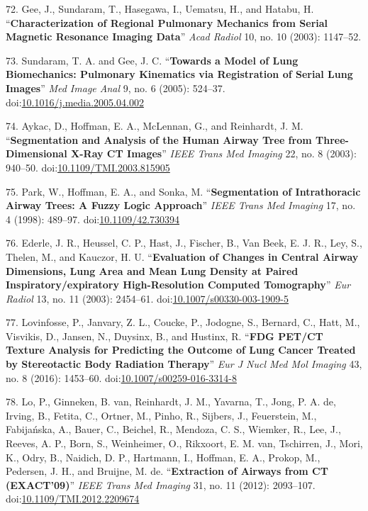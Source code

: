 \documentclass[11pt,]{article}
\begin{document}
\hypertarget{ref-Gee:2003aa}{}
72. Gee, J., Sundaram, T., Hasegawa, I., Uematsu, H., and Hatabu, H.
``\textbf{Characterization of Regional Pulmonary Mechanics from Serial
Magnetic Resonance Imaging Data}'' \emph{Acad Radiol} 10, no. 10 (2003):
1147--52.

\hypertarget{ref-Sundaram:2005aa}{}
73. Sundaram, T. A. and Gee, J. C. ``\textbf{Towards a Model of Lung
Biomechanics: Pulmonary Kinematics via Registration of Serial Lung
Images}'' \emph{Med Image Anal} 9, no. 6 (2005): 524--37.
doi:\href{https://doi.org/10.1016/j.media.2005.04.002}{10.1016/j.media.2005.04.002}

\hypertarget{ref-Aykac:2003aa}{}
74. Aykac, D., Hoffman, E. A., McLennan, G., and Reinhardt, J. M.
``\textbf{Segmentation and Analysis of the Human Airway Tree from
Three-Dimensional X-Ray CT Images}'' \emph{IEEE Trans Med Imaging} 22,
no. 8 (2003): 940--50.
doi:\href{https://doi.org/10.1109/TMI.2003.815905}{10.1109/TMI.2003.815905}

\hypertarget{ref-Park:1998aa}{}
75. Park, W., Hoffman, E. A., and Sonka, M. ``\textbf{Segmentation of
Intrathoracic Airway Trees: A Fuzzy Logic Approach}'' \emph{IEEE Trans
Med Imaging} 17, no. 4 (1998): 489--97.
doi:\href{https://doi.org/10.1109/42.730394}{10.1109/42.730394}

\hypertarget{ref-Ederle:2003aa}{}
76. Ederle, J. R., Heussel, C. P., Hast, J., Fischer, B., Van Beek, E.
J. R., Ley, S., Thelen, M., and Kauczor, H. U. ``\textbf{Evaluation of
Changes in Central Airway Dimensions, Lung Area and Mean Lung Density at
Paired Inspiratory/expiratory High-Resolution Computed Tomography}''
\emph{Eur Radiol} 13, no. 11 (2003): 2454--61.
doi:\href{https://doi.org/10.1007/s00330-003-1909-5}{10.1007/s00330-003-1909-5}

\hypertarget{ref-Lovinfosse:2016aa}{}
77. Lovinfosse, P., Janvary, Z. L., Coucke, P., Jodogne, S., Bernard,
C., Hatt, M., Visvikis, D., Jansen, N., Duysinx, B., and Hustinx, R.
``\textbf{FDG PET/CT Texture Analysis for Predicting the Outcome of Lung
Cancer Treated by Stereotactic Body Radiation Therapy}'' \emph{Eur J
Nucl Med Mol Imaging} 43, no. 8 (2016): 1453--60.
doi:\href{https://doi.org/10.1007/s00259-016-3314-8}{10.1007/s00259-016-3314-8}

\hypertarget{ref-Lo:2012aa}{}
78. Lo, P., Ginneken, B. van, Reinhardt, J. M., Yavarna, T., Jong, P. A.
de, Irving, B., Fetita, C., Ortner, M., Pinho, R., Sijbers, J.,
Feuerstein, M., Fabijańska, A., Bauer, C., Beichel, R., Mendoza, C. S.,
Wiemker, R., Lee, J., Reeves, A. P., Born, S., Weinheimer, O., Rikxoort,
E. M. van, Tschirren, J., Mori, K., Odry, B., Naidich, D. P., Hartmann,
I., Hoffman, E. A., Prokop, M., Pedersen, J. H., and Bruijne, M. de.
``\textbf{Extraction of Airways from CT (EXACT'09)}'' \emph{IEEE Trans
Med Imaging} 31, no. 11 (2012): 2093--107.
doi:\href{https://doi.org/10.1109/TMI.2012.2209674}{10.1109/TMI.2012.2209674}
\end{document}
